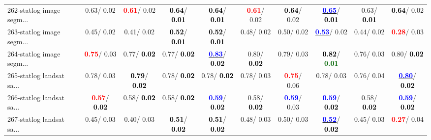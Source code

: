 \begin{table}[h]
\begin{center}
{\begin{tabular}{lc|c|c|c|c|c|c|c|c}
262-statlog image segm... &   0.63/  0.02 & \textcolor{red}{\textbf{  0.61}}/  0.02 & \textcolor{black}{\textbf{  0.64}}/\textcolor{black}{\textbf{  0.01}} & \textcolor{black}{\textbf{  0.64}}/\textcolor{black}{\textbf{  0.01}} & \textcolor{red}{\textbf{  0.61}}/  0.02 & \textcolor{black}{\textbf{  0.64}}/  0.02 & \underline{\textcolor{blue}{\textbf{  0.65}}}/\textcolor{black}{\textbf{  0.01}} &   0.63/\textcolor{black}{\textbf{  0.01}} & \textcolor{black}{\textbf{  0.64}}/  0.02 \\
263-statlog image segm... &   0.45/  0.02 &   0.41/  0.02 & \textcolor{black}{\textbf{  0.52}}/\textcolor{black}{\textbf{  0.01}} & \textcolor{black}{\textbf{  0.52}}/\textcolor{black}{\textbf{  0.01}} &   0.48/  0.02 &   0.50/  0.02 & \underline{\textcolor{blue}{\textbf{  0.53}}}/  0.02 &   0.44/  0.02 & \textcolor{red}{\textbf{  0.28}}/  0.03 \\ \hline
264-statlog image segm... & \textcolor{red}{\textbf{  0.75}}/  0.03 &   0.77/\textcolor{black}{\textbf{  0.02}} &   0.77/\textcolor{black}{\textbf{  0.02}} & \underline{\textcolor{blue}{\textbf{  0.83}}}/\textcolor{black}{\textbf{  0.02}} &   0.80/\textcolor{black}{\textbf{  0.02}} &   0.79/  0.03 & \textcolor{black}{\textbf{  0.82}}/\textcolor{darkgreen}{\textbf{  0.01}} &   0.76/  0.03 &   0.80/\textcolor{black}{\textbf{  0.02}} \\
265-statlog landsat sa... &   0.78/  0.03 & \textcolor{black}{\textbf{  0.79}}/\textcolor{black}{\textbf{  0.02}} &   0.78/\textcolor{black}{\textbf{  0.02}} &   0.78/\textcolor{black}{\textbf{  0.02}} &   0.78/  0.03 & \textcolor{red}{\textbf{  0.75}}/  0.06 &   0.78/  0.03 &   0.76/  0.04 & \underline{\textcolor{blue}{\textbf{  0.80}}}/\textcolor{black}{\textbf{  0.02}} \\
266-statlog landsat sa... & \textcolor{red}{\textbf{  0.57}}/\textcolor{black}{\textbf{  0.02}} &   0.58/\textcolor{black}{\textbf{  0.02}} &   0.58/\textcolor{black}{\textbf{  0.02}} & \textcolor{blue}{\textbf{  0.59}}/\textcolor{black}{\textbf{  0.02}} &   0.58/\textcolor{black}{\textbf{  0.02}} & \textcolor{blue}{\textbf{  0.59}}/  0.03 & \textcolor{blue}{\textbf{  0.59}}/\textcolor{black}{\textbf{  0.02}} &   0.58/\textcolor{black}{\textbf{  0.02}} & \textcolor{blue}{\textbf{  0.59}}/\textcolor{black}{\textbf{  0.02}} \\
267-statlog landsat sa... &   0.45/  0.03 &   0.40/  0.03 & \textcolor{black}{\textbf{  0.51}}/\textcolor{black}{\textbf{  0.02}} & \textcolor{black}{\textbf{  0.51}}/\textcolor{black}{\textbf{  0.02}} &   0.48/  0.03 &   0.50/  0.03 & \underline{\textcolor{blue}{\textbf{  0.52}}}/\textcolor{black}{\textbf{  0.02}} &   0.45/  0.03 & \textcolor{red}{\textbf{  0.27}}/  0.04 \\

\end{tabular}}
\end{center}
\end{table}
